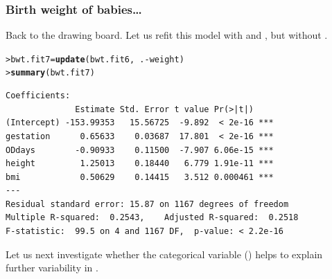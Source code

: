 \documentclass{beamer}\usepackage[]{graphicx}\usepackage[]{xcolor}
\makeatletter
\newcommand{\hlopt}[1]{\textcolor[rgb]{0,0,0}{#1}}%
\newcommand{\hlstd}[1]{\textcolor[rgb]{0.345,0.345,0.345}{#1}}%
\newcommand{\hlkwb}[1]{\textcolor[rgb]{0.69,0.353,0.396}{#1}}%
\newcommand{\hlkwd}[1]{\textcolor[rgb]{0.737,0.353,0.396}{\textbf{#1}}}%
\newenvironment{kframe}{%
 \def\at@end@of@kframe{}%
 \ifinner\ifhmode%
  \def\at@end@of@kframe{\end{minipage}}%
  \begin{minipage}{\columnwidth}%
 \fi\fi%
 \def\FrameCommand##1{\hskip\@totalleftmargin \hskip-\fboxsep
 \colorbox{shadecolor}{##1}\hskip-\fboxsep
     \hskip-\linewidth \hskip-\@totalleftmargin \hskip\columnwidth}%
 \MakeFramed {\advance\hsize-\width
   \@totalleftmargin\z@ \linewidth\hsize
   \@setminipage}}%
 {\par\unskip\endMakeFramed%
 \at@end@of@kframe}
\newenvironment{knitrout}{}{} %
\makeatother
\begin{document}
\begin{frame}[fragile]
\frametitle{Birth weight of babies\ldots}
Back to the drawing board. Let us refit this model with  and , but without .\\
\medskip
\begin{knitrout}\scriptsize
{}\color{fgcolor}\begin{kframe}
\begin{alltt}
\hlstd{> }\hlstd{bwt.fit7} \hlkwb{=} \hlkwd{update}\hlstd{(bwt.fit6,}\hlopt{~}\hlstd{.} \hlopt{-} \hlstd{weight)}
\hlstd{> }\hlkwd{summary}\hlstd{(bwt.fit7)}
\end{alltt}
\end{kframe}
\end{knitrout}

\begin{knitrout}\scriptsize
{}\color{fgcolor}\begin{kframe}
\begin{verbatim}
Coefficients:
              Estimate Std. Error t value Pr(>|t|)    
(Intercept) -153.99353   15.56725  -9.892  < 2e-16 ***
gestation      0.65633    0.03687  17.801  < 2e-16 ***
ODdays        -0.90933    0.11500  -7.907 6.06e-15 ***
height         1.25013    0.18440   6.779 1.91e-11 ***
bmi            0.50629    0.14415   3.512 0.000461 ***
---
Residual standard error: 15.87 on 1167 degrees of freedom
Multiple R-squared:  0.2543,	Adjusted R-squared:  0.2518 
F-statistic:  99.5 on 4 and 1167 DF,  p-value: < 2.2e-16
\end{verbatim}
\end{kframe}
\end{knitrout}

Let us next investigate whether the categorical variable () helps to
explain further variability in .
\end{frame}
\end{document}
